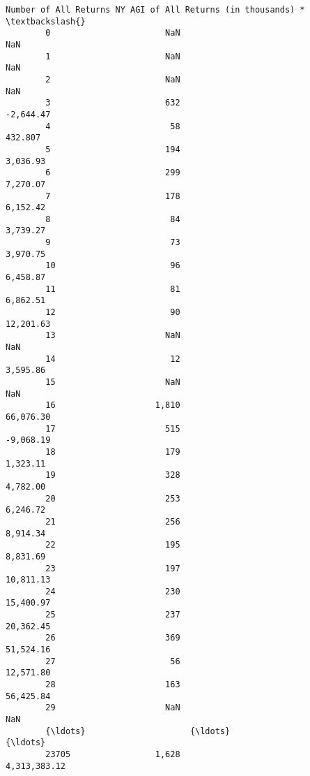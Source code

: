\documentclass[11pt]{article}
\begin{document}
\begin{Verbatim}[commandchars=\\\{\}]
              Number of All Returns NY AGI of All Returns (in thousands) *  \textbackslash{}
        0                       NaN                                    NaN   
        1                       NaN                                    NaN   
        2                       NaN                                    NaN   
        3                       632                              -2,644.47   
        4                        58                                432.807   
        5                       194                               3,036.93   
        6                       299                               7,270.07   
        7                       178                               6,152.42   
        8                        84                               3,739.27   
        9                        73                               3,970.75   
        10                       96                               6,458.87   
        11                       81                               6,862.51   
        12                       90                              12,201.63   
        13                      NaN                                    NaN   
        14                       12                               3,595.86   
        15                      NaN                                    NaN   
        16                    1,810                              66,076.30   
        17                      515                              -9,068.19   
        18                      179                               1,323.11   
        19                      328                               4,782.00   
        20                      253                               6,246.72   
        21                      256                               8,914.34   
        22                      195                               8,831.69   
        23                      197                              10,811.13   
        24                      230                              15,400.97   
        25                      237                              20,362.45   
        26                      369                              51,524.16   
        27                       56                              12,571.80   
        28                      163                              56,425.84   
        29                      NaN                                    NaN   
        {\ldots}                     {\ldots}                                    {\ldots}   
        23705                 1,628                           4,313,383.12   

\end{Verbatim}
\end{document}
